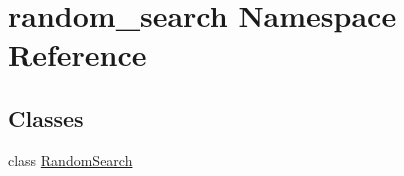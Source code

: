 \hypertarget{namespacerandom__search}{}\section{random\+\_\+search Namespace Reference}
\label{namespacerandom__search}
\subsection*{Classes}
\begin{DoxyCompactItemize}
\item 
class \hyperlink{classrandom__search_1_1_random_search}{Random\+Search}
\end{DoxyCompactItemize}
